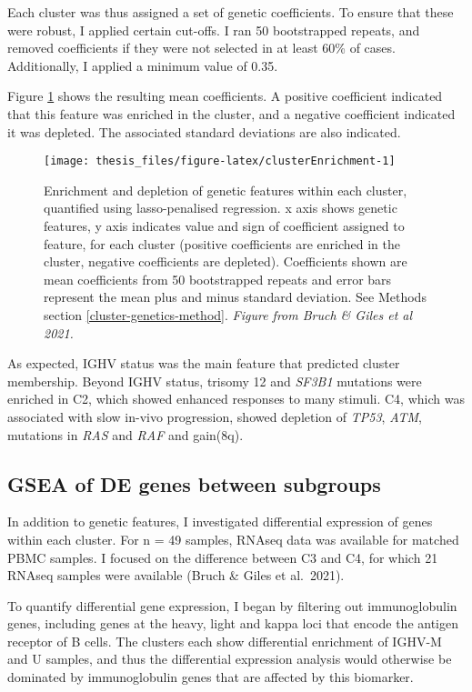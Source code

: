 \documentclass[11pt, a4paper, twosided]{book}
\begin{document}
Each cluster was thus assigned a set of genetic coefficients. To ensure that these were robust, I applied certain cut-offs. I ran 50 bootstrapped repeats, and removed coefficients if they were not selected in at least 60\% of cases. Additionally, I applied a minimum value of 0.35.

Figure \ref{fig:clusterEnrichment} shows the resulting mean coefficients. A positive coefficient indicated that this feature was enriched in the cluster, and a negative coefficient indicated it was depleted. The associated standard deviations are also indicated.


\begin{figure}

{\centering \texttt{[image: thesis\_files/figure-latex/clusterEnrichment-1]} 

}

\caption{Enrichment and depletion of genetic features within each cluster, quantified using lasso-penalised regression. x axis shows genetic features, y axis indicates value and sign of coefficient assigned to feature, for each cluster (positive coefficients are enriched in the cluster, negative coefficients are depleted). Coefficients shown are mean coefficients from 50 bootstrapped repeats and error bars represent the mean plus and minus standard deviation. See Methods section \ref{cluster-genetics-method}. \emph{Figure from Bruch \& Giles et al 2021. }}\label{fig:clusterEnrichment}
\end{figure}
As expected, IGHV status was the main feature that predicted cluster membership. Beyond IGHV status, trisomy 12 and \emph{SF3B1} mutations were enriched in C2, which showed enhanced responses to many stimuli. C4, which was associated with slow in-vivo progression, showed depletion of \emph{TP53}, \emph{ATM}, mutations in \emph{RAS} and \emph{RAF} and gain(8q).

\hypertarget{cluster-rna}{%
\subsection{GSEA of DE genes between subgroups}\label{cluster-rna}}

In addition to genetic features, I investigated differential expression of genes within each cluster. For n = 49 samples, RNAseq data was available for matched PBMC samples. I focused on the difference between C3 and C4, for which 21 RNAseq samples were available (Bruch \& Giles et al.~2021).

To quantify differential gene expression, I began by filtering out immunoglobulin genes, including genes at the heavy, light and kappa loci that encode the antigen receptor of B cells. The clusters each show differential enrichment of IGHV-M and U samples, and thus the differential expression analysis would otherwise be dominated by immunoglobulin genes that are affected by this biomarker.
\end{document}
